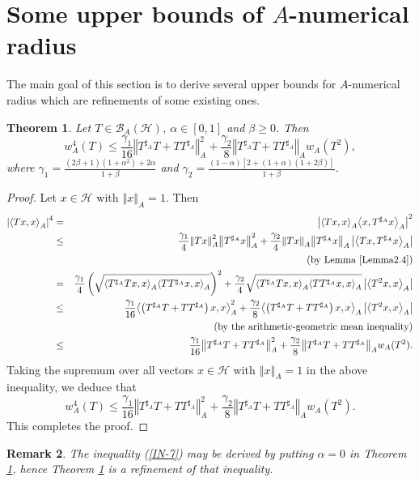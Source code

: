 \documentclass{article}
\newcommand{\bra}[1]{\left(#1\right)}
\newcommand{\sbra}[1]{\left[#1\right]}
\newcommand{\seqA}[1]{{\left<#1\right>}_{A}}
\newcommand{\normA}[1]{{\left\Vert#1\right\Vert}_{A}}
\newcommand{\abs}[1]{\left\vert#1\right\vert}
\newcommand {\h}{\mathcal{H}}
\newcommand {\Ta}{T^{\sharp_{A}}}
\renewcommand {\b}{\mathcal{B}}
\newtheorem{theorem}{Theorem}[section]
\newtheorem{remark}[theorem]{Remark}
\begin{document}
\section{Some upper bounds of $A$-numerical radius}
The main goal of this section is to derive several upper bounds for $A$-numerical
radius which are refinements of some existing ones.
\begin{theorem}\label{Thm-3.1} Let $T\in\b_A(\h)$, $\alpha\in[0,1]$ and $\beta\geq 0$. Then
\begin{equation}\label{Ineq3.1}
  w_A^4(T)\leq \frac{\gamma_1}{16}\normA{\Ta T+T\Ta}^2+ \frac{\gamma_2}{8}\normA{\Ta T+T\Ta}w_A(T^2),
\end{equation}
where $\gamma_1=\frac{(2\beta+1)(1+\alpha^2)+2\alpha}{1+\beta}$ and $\gamma_2=\frac{\bra{1-\alpha}\sbra{2+(1+\alpha)(1+2\beta)}}{1+\beta}$.
\end{theorem}
\begin{proof} Let $x\in\h$ with $\normA{x}=1$. Then
\begin{eqnarray*}
  \abs{\seqA{Tx,x}}^4 &=& \abs{\seqA{Tx,x}\seqA{x,\Ta x}}^2 \\
   &\leq& \frac{\gamma_1}{4}\normA{Tx}^2\normA{\Ta x}^2+\frac{\gamma_2}{4}\normA{Tx}\normA{\Ta x}\abs{\seqA{Tx,\Ta x}}\\
  &&\bra{\mbox{by Lemma \ref{Lemma2.4}}}\\
  &=&\frac{\gamma_1}{4}\bra{\sqrt{\seqA{\Ta Tx,x}\seqA{T\Ta x,x}}}^2+\frac{\gamma_2}{4}\sqrt{\seqA{\Ta Tx,x}\seqA{T\Ta x,x}}\abs{\seqA{T^2x,x}}\\
  &\leq&\frac{\gamma_1}{16}\seqA{\bra{\Ta T+T\Ta}x,x}^2+ \frac{\gamma_2}{8}\seqA{\bra{\Ta T+T\Ta}x,x}\abs{\seqA{T^2x,x}}\\
  &&\bra{\mbox{by the arithmetic-geometric mean inequality}}\\
  &\leq&\frac{\gamma_1}{16}\normA{\Ta T+T\Ta}^2+ \frac{\gamma_2}{8}\normA{\Ta T+T\Ta}w_A(T^2).
\end{eqnarray*}
Taking the supremum over all vectors $x\in\h$ with $\normA{x}=1$ in the above inequality, we deduce that
$$w_A^4(T)\leq \frac{\gamma_1}{16}\normA{\Ta T+T\Ta}^2+ \frac{\gamma_2}{8}\normA{\Ta T+T\Ta}w_A(T^2).$$
This completes the proof.
\end{proof}
\begin{remark} The inequality (\ref{IN-7}) may be derived by putting $\alpha=0$ in Theorem \ref{Thm-3.1}, hence Theorem \ref{Thm-3.1} is a refinement of that inequality.
\end{remark}
\end{document}
